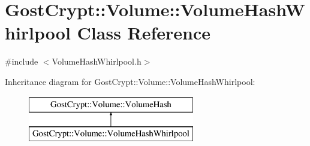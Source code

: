 \hypertarget{class_gost_crypt_1_1_volume_1_1_volume_hash_whirlpool}{}\section{Gost\+Crypt\+:\+:Volume\+:\+:Volume\+Hash\+Whirlpool Class Reference}
\label{class_gost_crypt_1_1_volume_1_1_volume_hash_whirlpool}


{\ttfamily \#include $<$Volume\+Hash\+Whirlpool.\+h$>$}

Inheritance diagram for Gost\+Crypt\+:\+:Volume\+:\+:Volume\+Hash\+Whirlpool\+:\begin{figure}[H]
\begin{center}
\leavevmode
\includegraphics[height=2.000000cm]{class_gost_crypt_1_1_volume_1_1_volume_hash_whirlpool}
\end{center}
\end{figure}
